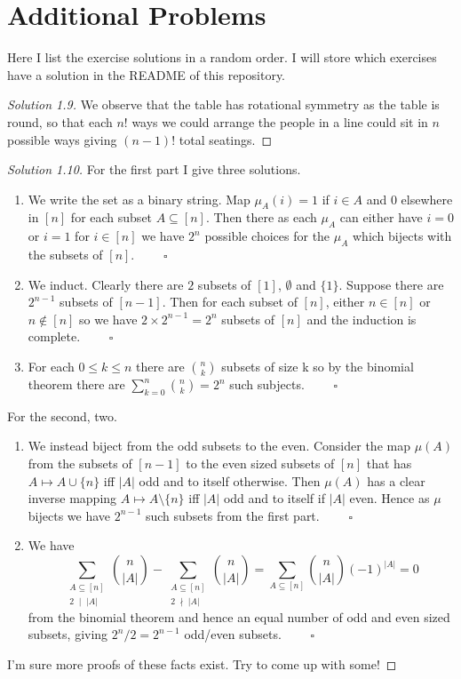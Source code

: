 \documentclass{article}
\begin{document}
\newpage

\section{Additional Problems}

Here I list the exercise solutions in a random order. I will store which exercises have a solution in the README of this repository. 

\begin{proof}[Solution 1.9]
    We observe that the table has rotational symmetry as the table is round, so that each $n!$ ways we could arrange the people in a line 
    could sit in $n$ possible ways giving $(n-1)!$ total seatings. 
\end{proof}

\begin{proof}[Solution 1.10]
    For the first part I give three solutions.
    \begin{enumerate}
        \item We write the set as a binary string. 
        Map $\mu_A(i) = 1$  if $i \in A$ and $0$ elsewhere in $[n]$ for each subset $A \subseteq [n]$. Then there as each $\mu_A$ 
        can either have $i = 0$ or $i = 1$ for $i \in [n]$ we have $2^n$ possible choices for the $\mu_A$ which bijects with the subsets 
        of $[n]$. $\qquad \square$
        \item We induct. 
        Clearly there are $2$ subsets of $[1]$, $\emptyset$ and $\{1\}$. Suppose there are $2^{n-1}$ subsets of $[n-1]$. Then for each subset
        of $[n]$, either $n \in [n]$ or $n \notin [n]$ so we have $2 \times 2^{n-1} =2^n$ subsets of $[n]$ and the induction is complete. $\qquad \square$
        \item For each $0 \leq k \leq n$ there are $\binom{n}{k}$ subsets of size k so by the binomial theorem there are 
        $\sum_{k = 0}^n \binom{n}{k} = 2^n$ such subjects. $\qquad \square$ 
    \end{enumerate}
    For the second, two. 
    \begin{enumerate}
        \item We instead biject from the odd subsets to the even. Consider the map $\mu(A)$ from the subsets of $[n-1]$ to the even sized 
        subsets of $[n]$ that has $A \mapsto A \cup \{n\}$ iff $|A|$ odd and to itself otherwise. Then $\mu(A)$ has a clear inverse 
        mapping $A \mapsto A \setminus \{n\}$ iff $|A|$ odd and to itself if $|A|$ even. Hence as $\mu$ bijects we have $2^{n-1}$ such 
        subsets from the first part. $\qquad \square$
        \item We have 
        \[\sum_{\substack{A \subseteq [n] \\ 2 \;  \mid \; |A|}}\binom{n}{|A|} - \sum_{\substack{A \subseteq [n] \\ 2 \; \nmid \; |A|}}\binom{n}{|A|}
        = \sum_{A \subseteq [n]} \binom{n}{|A|}(-1)^{|A|} = 0\] 
        from the binomial theorem and hence an equal number of odd and even sized subsets, giving $2^n / 2 = 2^{n-1}$ odd/even subsets. $\qquad \square$
    \end{enumerate}
    I'm sure more proofs of these facts exist. Try to come up with some!
\end{proof}
\end{document}
